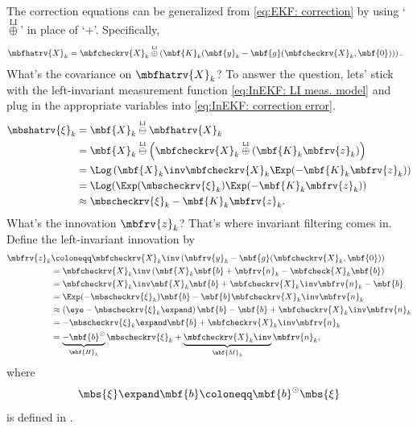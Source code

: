 \documentclass[nobib]{tufte-handout}
\newcommand{\liplus}{\overset{{\scriptscriptstyle\mathrm{LI}}}{\oplus}}
\newcommand{\liminus}{\overset{{\scriptscriptstyle\mathrm{LI}}}{\ominus}}
\begin{document}
    The correction equations can be generalized from \eqref{eq:EKF: correction} by using `$\liplus$' in place of `$+$'. Specifically,
    \begin{align}
        \mbfhatrv{X}_{k} &= \mbfcheckrv{X}_{k} \liplus \left( \mbf{K}_{k}(\mbf{y}_{k} - \mbf{g}(\mbfcheckrv{X}_{k}, \mbf{0})) \right).
    \end{align}
    What's the covariance on $\mbfhatrv{X}_{k}$?
     To answer the question, lets' stick with the left-invariant measurement function \eqref{eq:InEKF: LI meas. model} and plug in the appropriate variables into \eqref{eq:InEKF: correction error}.
    \begin{align}
        \mbshatrv{\xi}_{k} 
        &= \mbf{X}_{k}\liminus\mbfhatrv{X}_{k}\\
        &= \mbf{X}_{k} \liminus \left( \mbfcheckrv{X}_{k}\liplus (\mbf{K}_{k}\mbfrv{z}_{k}) \right)\\
        &= \Log\left( \mbf{X}_{k}\inv\mbfcheckrv{X}_{k}\Exp(-\mbf{K}_{k}\mbfrv{z}_{k}) \right)\\
        &= \Log(\Exp(\mbscheckrv{\xi}_{k})\Exp(-\mbf{K}_{k}\mbfrv{z}_{k}))\\
        \label{eq:InEKF: correction error as a function of innovation}
        &\approx \mbscheckrv{\xi}_{k} - \mbf{K}_{k}\mbfrv{z}_{k}.
    \end{align}
    What's the innovation $\mbfrv{z}_{k}$? That's where invariant filtering comes in. Define the left-invariant innovation by
    \begin{align}
        \label{eq:InEKF: innovation: begin}
        \mbfrv{z}_{k} 
        &\coloneqq \mbfcheckrv{X}_{k}\inv\left( \mbfrv{y}_{k} - \mbf{g}(\mbfcheckrv{X}_{k},\mbf{0}) \right)\\
        &= \mbfcheckrv{X}_{k}\inv\left( \mbf{X}_{k}\mbf{b} + \mbfrv{n}_{k} - \mbfcheck{X}_{k}\mbf{b}\right)\\
        &= \mbfcheckrv{X}_{k}\inv\mbf{X}_{k}\mbf{b} + \mbfcheckrv{X}_{k}\inv\mbfrv{n}_{k} - \mbf{b}\\
        &= \Exp(-\mbscheckrv{\xi}_{k})\mbf{b} - \mbf{b} \mbfcheckrv{X}_{k}\inv\mbfrv{n}_{k}\\
        &\approx \left( \eye - \mbscheckrv{\xi}_{k}\expand \right)\mbf{b} - \mbf{b} + \mbfcheckrv{X}_{k}\inv\mbfrv{n}_{k}\\
        &= -\mbscheckrv{\xi}_{k}\expand\mbf{b} + \mbfcheckrv{X}_{k}\inv\mbfrv{n}_{k}\\
        \label{eq:InEKF: innovation: Jacobians}
        &= \underbrace{-\mbf{b}^{\odot}}_{\mbf{H}_{k}}\mbscheckrv{\xi}_{k} + \underbrace{\mbfcheckrv{X}_{k}\inv}_{\mbf{M}_{k}}\mbfrv{n}_{k},
    \end{align}
    where 
    \begin{align}
        \mbs{\xi}\expand\mbf{b} \coloneqq \mbf{b}^{\odot}\mbs{\xi}
    \end{align}
    is defined in \cite[pg.~253]{Barfoot_State_2017a}.
    
\end{document}
